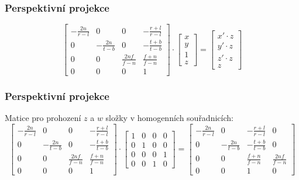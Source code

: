 \begin{frame}
\frametitle{Perspektivní projekce}
{\tiny
\begin{equation}
\label{eq:persmat1}
\left[
\begin{array}{cccc} 
-\frac{2n}{r-l} & 0               & 0                & -\frac{r+l}{r-l} \\
0               & -\frac{2n}{t-b} & 0                & -\frac{t+b}{t-b} \\
0               & 0               & \frac{2nf}{f-n} & \frac{f+n}{f-n} \\
0               & 0               & 0                & 1
\end{array}
\right]
\cdot
\left[
\begin{array}{c}
x \\
y \\
1 \\
z
\end{array}
\right]
=
\left[
\begin{array}{c}
x'\cdot z \\
y'\cdot z \\
z'\cdot z \\
z
\end{array}
\right]
\end{equation}
}
\end{frame}

\begin{frame}
\frametitle{Perspektivní projekce}
Matice pro prohození $z$ a $w$ složky v homogenních souřadnicích:
{\tiny
\begin{equation}
\left[
\begin{array}{cccc} 
-\frac{2n}{r-l} & 0               & 0               & -\frac{r+l}{r-l} \\
0               & -\frac{2n}{t-b} & 0               & -\frac{t+b}{t-b} \\
0               & 0               & \frac{2nf}{f-n} & \frac{f+n}{f-n} \\
0               & 0               & 0               & 1
\end{array}
\right]
\cdot
\left[
\begin{array}{cccc} 
1 & 0 & 0 & 0 \\
0 & 1 & 0 & 0 \\
0 & 0 & 0 & 1 \\
0 & 0 & 1 & 0
\end{array}
\right]
=
\left[
\begin{array}{cccc} 
-\frac{2n}{r-l} & 0               & -\frac{r+l}{r-l} & 0 \\
0               & -\frac{2n}{t-b} & -\frac{t+b}{t-b} & 0 \\
0               & 0               & \frac{f+n}{f-n} & \frac{2nf}{f-n} \\
0               & 0               & 1                & 0
\end{array}
\right]
\end{equation}
}
\end{frame}

